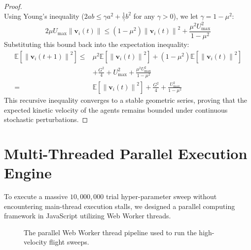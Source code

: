 \documentclass[letterpaper, 10pt, conference]{IEEEtran}
\newcommand{\norm}[1]{\left\lVert#1\right\rVert}
\begin{document}
\begin{proof}
\begin{equation}
\end{equation}
Using Young's inequality ($2ab \leq \gamma a^2 + \frac{1}{\gamma} b^2$ for any $\gamma > 0$), we let $\gamma = 1 - \mu^2$:
\begin{equation}
    2\mu U_{\max} \norm{\mathbf{v}_i(t)} \leq (1 - \mu^2) \norm{\mathbf{v}_i(t)}^2 + \frac{\mu^2 U_{\max}^2}{1 - \mu^2}
\end{equation}
Substituting this bound back into the expectation inequality:
\begin{align}
    \mathbb{E}\left[\norm{\mathbf{v}_i(t+1)}^2\right] \leq &\mu^2 \mathbb{E}\left[\norm{\mathbf{v}_i(t)}^2\right] + (1 - \mu^2)\mathbb{E}\left[\norm{\mathbf{v}_i(t)}^2\right] \nonumber \\
    &+ \frac{G^2}{4} + U_{\max}^2 + \frac{\mu^2 U_{\max}^2}{1 - \mu^2} \nonumber \\
    = &\mathbb{E}\left[\norm{\mathbf{v}_i(t)}^2\right] + \frac{G^2}{4} + \frac{U_{\max}^2}{1 - \mu^2}
\end{align}
This recursive inequality converges to a stable geometric series, proving that the expected kinetic velocity of the agents remains bounded under continuous stochastic perturbations.
\end{proof}

\section{Multi-Threaded Parallel Execution Engine}
\label{sec:simulation}

To execute a massive $10{,}000{,}000$ trial hyper-parameter sweep without encountering main-thread execution stalls, we designed a parallel computing framework in JavaScript utilizing Web Worker threads.

\begin{figure}[H]
\centering
{}
\caption{The parallel Web Worker thread pipeline used to run the high-velocity flight sweeps.}
\label{fig:multithread}
\end{figure}
\end{document}
